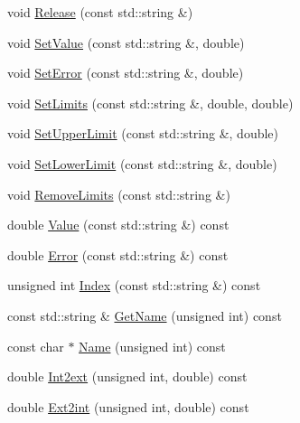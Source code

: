 \begin{DoxyCompactItemize}
\item 
void \mbox{\hyperlink{classROOT_1_1Minuit2_1_1MnUserParameterState_ae35c9bfa1e967c16542143a99a6f03eb}{Release}} (const std\+::string \&)
\item 
void \mbox{\hyperlink{classROOT_1_1Minuit2_1_1MnUserParameterState_abc93cf38ae05fdbb8472c1b5d589e947}{Set\+Value}} (const std\+::string \&, double)
\item 
void \mbox{\hyperlink{classROOT_1_1Minuit2_1_1MnUserParameterState_a7960c179d85d1595f02772c4a8dff85f}{Set\+Error}} (const std\+::string \&, double)
\item 
void \mbox{\hyperlink{classROOT_1_1Minuit2_1_1MnUserParameterState_ab178dda717939b16da948c96d2180b89}{Set\+Limits}} (const std\+::string \&, double, double)
\item 
void \mbox{\hyperlink{classROOT_1_1Minuit2_1_1MnUserParameterState_ab61a4e78b23aa76315662cf9bd07a012}{Set\+Upper\+Limit}} (const std\+::string \&, double)
\item 
void \mbox{\hyperlink{classROOT_1_1Minuit2_1_1MnUserParameterState_afc9466eb6db8e8f07309dcd7a760d116}{Set\+Lower\+Limit}} (const std\+::string \&, double)
\item 
void \mbox{\hyperlink{classROOT_1_1Minuit2_1_1MnUserParameterState_ac71dfd669559be76ed62fdf221a017d5}{Remove\+Limits}} (const std\+::string \&)
\item 
double \mbox{\hyperlink{classROOT_1_1Minuit2_1_1MnUserParameterState_a02135107320f1ce5680fe25cf406f08f}{Value}} (const std\+::string \&) const
\item 
double \mbox{\hyperlink{classROOT_1_1Minuit2_1_1MnUserParameterState_a74ae393362454df2808936090391560f}{Error}} (const std\+::string \&) const
\item 
unsigned int \mbox{\hyperlink{classROOT_1_1Minuit2_1_1MnUserParameterState_a2301d51ec17effc44792821d4482cb14}{Index}} (const std\+::string \&) const
\item 
const std\+::string \& \mbox{\hyperlink{classROOT_1_1Minuit2_1_1MnUserParameterState_a491c35a111b242ee53a8c150b53da67b}{Get\+Name}} (unsigned int) const
\item 
const char $\ast$ \mbox{\hyperlink{classROOT_1_1Minuit2_1_1MnUserParameterState_a9bb4ce8eb968c5112c3e33a0b7a32609}{Name}} (unsigned int) const
\item 
double \mbox{\hyperlink{classROOT_1_1Minuit2_1_1MnUserParameterState_a4ade4b298d85f6192ffa7d7723aa5b97}{Int2ext}} (unsigned int, double) const
\item 
double \mbox{\hyperlink{classROOT_1_1Minuit2_1_1MnUserParameterState_a8e0b79e3a150b2ccd15678755b1adb4a}{Ext2int}} (unsigned int, double) const

\end{DoxyCompactItemize}
